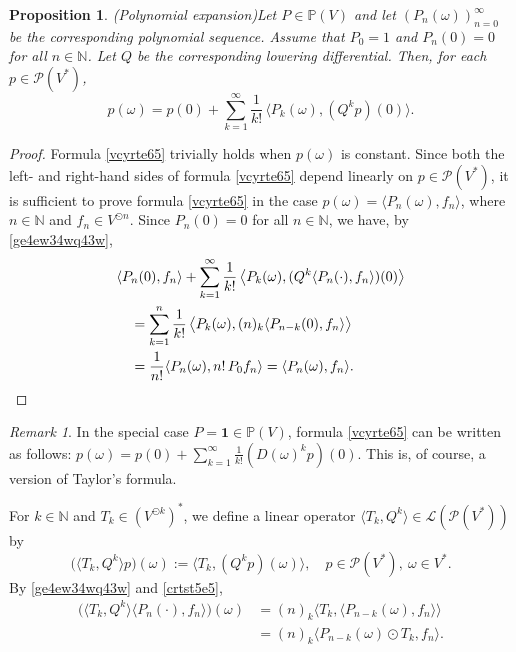 \documentclass[12pt]{article}
\newtheorem{proposition}[theorem]{Proposition}
\theoremstyle{remark}
\theoremstyle{remark}
\theoremstyle{remark}
\newtheorem{remark}[theorem]{Remark}
\begin{document}
\begin{proposition}(Polynomial expansion)\label{dyrde6e6e645} 
Let $P\in\mathbb P(V)$ and let $(P_n(\omega))_{n=0}^\infty$ be the corresponding polynomial sequence. Assume that  $P_{0}=1$ and $P_n(0)=0$ for all $n\in\mathbb N$. Let $Q$ be the corresponding lowering differential. Then, for each $p\in \mathcal P  (V^*)$, 
\begin{equation}\label{vcyrte65}
p(\omega)=p(0)+\sum_{k=1}^\infty \frac{1}{k!}\,\big\langle P_k(\omega),(Q^{k}p)(0)\big\rangle.
\end{equation}
\end{proposition}

\begin{proof} Formula \eqref{vcyrte65} trivially holds when $p(\omega)$ is constant. 
Since both the left- and right-hand sides of formula \eqref{vcyrte65} depend linearly on $p\in \mathcal P  (V^*)$,   it is sufficient to prove formula \eqref{vcyrte65} in the case $p(\omega)=\langle P_n(\omega), f_n \rangle$, where  $n \in \mathbb{N}$ and $f_n\in V^{\odot n}$. 
Since $P_n(0)=0$ for all $n\in\mathbb N$,  
we have, by \eqref{ge4ew34wq43w},
\begin{align*}&\langle P_n(0),f_n\rangle+ \sum_{k=1}^\infty \frac{1}{k!}\,\big\langle P_k(\omega), (Q^{k}\langle P_n(\cdot),f_n\rangle)(0)\big\rangle\\
&\quad=\sum_{k=1}^n \frac{1}{k!}\,\big\langle P_k(\omega),
(n)_k\langle P_{n-k}(0),f_n\rangle\big\rangle\\
&\quad=\frac1{n!}\langle P_n(\omega), n!\, P_0f_n
\rangle=\langle P_n(\omega),f_n\rangle. \qedhere
\end{align*} 
\end{proof}

\begin{remark} In the special case $P=\mathbf 1\in\mathbb P(V)$, formula \eqref{vcyrte65} can be written  as follows:
$p(\omega)=p(0)+\sum_{k=1}^\infty\frac1{k!}(D(\omega)^kp)(0)$. This is, of course, a version of Taylor's formula. \end{remark}

For $k\in\mathbb N$ and $T_k\in (V^{\odot  k})^*$, we define a linear operator $\langle T_k,Q^{k}\rangle \in\mathcal L(\mathcal P(V^*))$ by 
\begin{equation}\label{crtst5e5}
\big(\langle T_k,Q^{k}\rangle  p\big)(\omega):=\big\langle T_k,(Q^{k}p)(\omega)\big\rangle,\quad p\in\mathcal P(V^*),\ \omega\in V^*.
\end{equation} 
By \eqref{ge4ew34wq43w} and \eqref{crtst5e5},
\begin{align}
\big(\langle T_k, Q^{k}\rangle \langle P_n(\cdot),f_n\rangle\big)(\omega)&=
(n)_k\big\langle T_k,\langle  P_{n-k}(\omega),f_n\rangle\big\rangle\label{treseaw4aq42q24}\\
&=(n)_k\langle P_{n-k}(\omega)\odot T_k,f_n\rangle.\label{csesea43}
\end{align}
\end{document}
